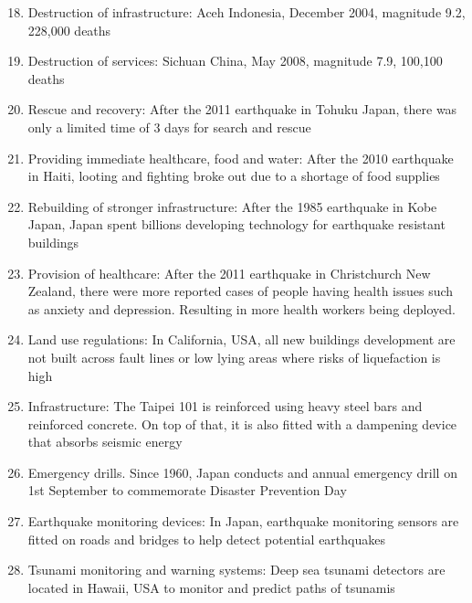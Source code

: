\documentclass[oneside]{book}
\begin{document}
\begin{minipage}{0.5\textwidth}
  \begin{enumerate}
    \setcounter{enumi}{17}
    \item Destruction of infrastructure: Aceh Indonesia, December 2004, magnitude 9.2, 228,000 deaths
    
    \item Destruction of services: Sichuan China, May 2008, magnitude 7.9, 100,100 deaths
    
    \item Rescue and recovery: After the 2011 earthquake in Tohuku Japan, there was only a limited time of 3 days for search and rescue
    
    \item Providing immediate healthcare, food and water: After the 2010 earthquake in Haiti, looting and fighting broke out due to a shortage of food supplies
    
    \item Rebuilding of stronger infrastructure: After the 1985 earthquake in Kobe Japan, Japan spent billions developing technology for earthquake resistant buildings
    
    \item Provision of healthcare: After the 2011 earthquake in Christchurch New Zealand, there were more reported cases of people having health issues such as anxiety and depression. Resulting in more health workers being deployed.
    
    \item Land use regulations: In California, USA, all new buildings development are not built across fault lines or low lying areas where risks of liquefaction is high
    
    \item Infrastructure: The Taipei 101 is reinforced using heavy steel bars and reinforced concrete. On top of that, it is also fitted with a dampening device that absorbs seismic energy
    
    \item Emergency drills. Since 1960, Japan conducts and annual emergency drill on 1st September to commemorate Disaster Prevention Day
    
    \item Earthquake monitoring devices: In Japan, earthquake monitoring sensors are fitted on roads and bridges to help detect potential earthquakes
    
    \item Tsunami monitoring and warning systems: Deep sea tsunami detectors are located in Hawaii, USA to monitor and predict paths of tsunamis
  \end{enumerate}  
  \vspace{2.7cm}
\end{minipage}
\end{document}
